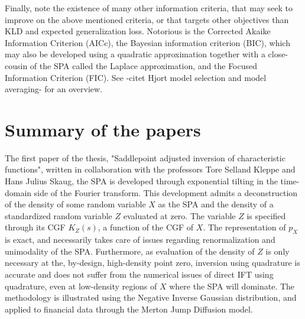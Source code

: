 Finally, note the existence of many other information criteria, that may seek to improve on the above mentioned criteria, or that targets other objectives than KLD and expected generalization loss. Notorious is the Corrected Akaike Information Criterion (AICc), the Bayesian information criterion (BIC), which may also be developed using a quadratic approximation together with a close-cousin of the SPA called the Laplace approximation, and the Focused Information Criterion (FIC).
See -citet Hjort model selection and model averaging- for an overview.


\chapter{Summary of the papers}

The first paper of the thesis, "Saddlepoint adjusted inversion of characteristic functions", written in collaboration with the professors Tore Selland Kleppe and Hans Julius Skaug, the SPA is developed through exponential tilting in the time-domain side of the Fourier transform. 
This development admits a deconstruction of the density of some random variable $X$ as the SPA and the density of a standardized random variable $Z$ evaluated at zero. The variable $Z$ is specified through its CGF $K_Z(s)$, a function of the CGF of $X$.
The representation of $p_X$ is exact, and necessarily takes care of issues regarding renormalization and unimodality of the SPA.
Furthermore, as evaluation of the density of $Z$ is only necessary at the, by-design, high-density point zero, inversion using quadrature is accurate and does not suffer from the numerical issues of direct IFT using quadrature, even at low-density regions of $X$ where the SPA will dominate.
The methodology is illustrated using the Negative Inverse Gaussian distribution, and applied to financial data through the Merton Jump Diffusion model.


